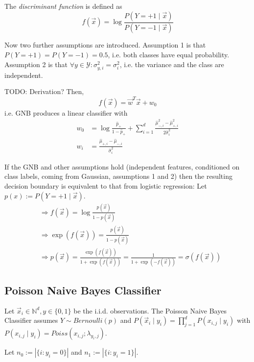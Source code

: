 The \emph{discriminant function} is defined as
\begin{equation*}
    f(\vec{x}) = \log{\frac
    {P(Y = +1 \mid \vec{x})}
    {P(Y = -1 \mid \vec{x})}
    }
\end{equation*}

Now two further assumptions are introduced.
Assumption 1 is that
$P(Y = +1) = P(Y = -1) = 0.5$,
i.e. both classes have equal probability.
Assumption 2 is that
$\forall y \in \mathcal{Y} : \sigma^2_{y,i} = \sigma^2_i$,
i.e. the variance and the class are independent.

TODO: Derivation?
Then,
\begin{equation*}
    f(\vec{x}) = \vec{w}^T \vec{x} + w_0
\end{equation*}
i.e. GNB produces a linear classifier with
\begin{align*}
    w_0 &= \log{\frac{\hat{p}_+}{1-\hat{p}_+}}
    + \sum_{i=1}^d{
        \frac{\hat{\mu}^2_{-,i} - \hat{\mu}^2_{+, i}}{2\hat{\sigma}^2_i}
    } \\
    w_i &= \frac
    {\hat{\mu}_{+,i} - \hat{\mu}_{-,i}}
    {\hat{\sigma}^2_i}
\end{align*}

If the GNB and other assumptions hold
(independent features, conditioned on
class labels, coming from Gaussian, assumptions 1 and 2)
then the resulting decision boundary
is equivalent to that from logistic regression:
Let $p(x) := P(Y = +1 \mid \vec{x})$.
\begin{align*}
    &\Rightarrow f(\vec{x}) = \log{
    \frac{p(\vec{x})}{1 - p(\vec{x})}
    } \\
    &\Rightarrow \exp{(f(\vec{x}))}
    = \frac{p(\vec{x})}{1 - p(\vec{x})} \\
    &\Rightarrow p(\vec{x}) =
    \frac{\exp{(f(\vec{x}))}}
    {1 + \exp{(f(\vec{x}))}}
    = \frac{1}{1 + \exp{(-f(\vec{x}))}}
    = \sigma(f(\vec{x}))
\end{align*}


\subsection{Poisson Naive Bayes Classifier}
Let $\vec{x}_i \in \mathbb{N}^d, y \in \{0, 1\}$ be the
i.i.d. observations.
The Poisson Naive Bayes Classifier assumes
$Y \sim Bernoulli(p)$ and
$P(\vec{x}_i \mid y_i) = \prod_{j=1}^d{P(x_{i,j} \mid y_i)}$
with $P(x_{i,j} \mid y_i) = Poiss(x_{i, j}; \lambda_{y_i, j})$.

Let $n_0 := |\{i : y_i = 0\}|$ and
$n_1 := |\{i : y_i = 1\}|$.

